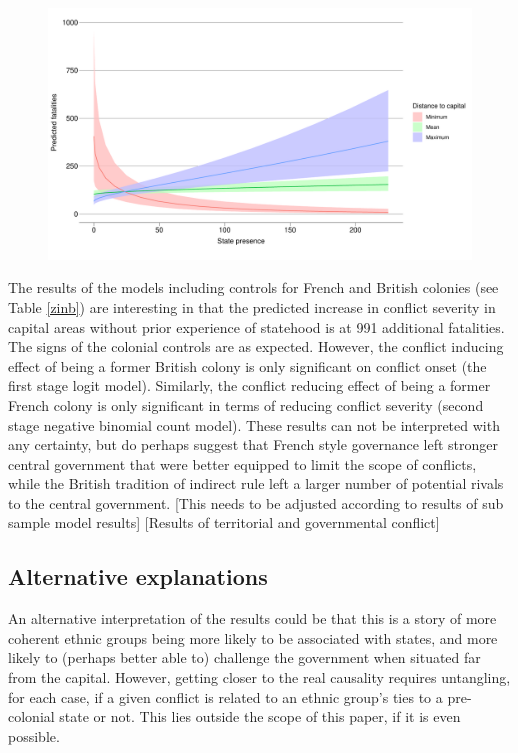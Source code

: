 \documentclass[12pt]{article}
\begin{document}
\begin{figure}[htpb]
	\centering
	\includegraphics[width=\linewidth]{"../R/Output/zinbplot.pdf"}
	\caption{}
	\label{deaths_zinb}
\end{figure}


The results of the models including controls for French and British colonies
(see Table \ref{zinb}) are interesting in that the predicted increase in conflict
severity in capital areas without prior experience of statehood is at 991
additional fatalities. The signs of the colonial controls are as
expected. However, the conflict inducing effect of being a former British
colony is only significant on conflict onset (the first stage logit
model). Similarly, the conflict reducing effect of being a former French colony
is only significant in terms of reducing conflict severity (second stage
negative binomial count model). These results can not be interpreted with any
certainty, but do perhaps suggest that French style governance left stronger
central government that were better equipped to limit the scope of conflicts,
while the British tradition of indirect rule left a larger number of potential
rivals to the central government. [This needs to be adjusted according to
results of sub sample model results] [Results of territorial and governmental
conflict]

\subsection{Alternative explanations} \label{Alternative explanations}

An alternative interpretation of the results could be that this is a
story of more coherent ethnic groups being more likely to be associated with
states, and more likely to (perhaps better able to) challenge the government
when situated far from the capital. However, getting closer to the real
causality requires untangling, for each case, if a given conflict is related to
an ethnic group's ties to a pre-colonial state or not. This lies outside the
scope of this paper, if it is even possible.
\end{document}

